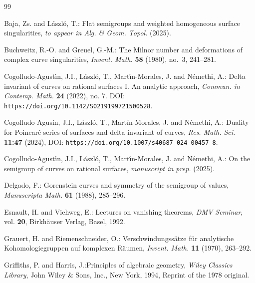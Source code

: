 \documentclass[12pt,a4paper]{amsart}
\theoremstyle{remark}
\theoremstyle{definition}
\begin{document}
%
%
\providecommand{\bysame}{\leavevmode\hbox to3em{\hrulefill}\thinspace}
\providecommand{\MR}{\relax\ifhmode\unskip\space\fi MR }
\providecommand{\MRhref}[2]{%
  \href{http://www.ams.org/mathscinet-getitem?mr=#1}{#2}
}
\begin{thebibliography}{99}

Baja, Zs. and L\'aszl\'o, T.:  Flat semigroups and weighted homogeneous surface singularities, 
{\em to appear in Alg. \& Geom. Topol.}  (2025).

Buchweitz, R.-O. and Greuel, G.-M.: The Milnor number and deformations of
complex curve singularities, \emph{Invent. Math.} \textbf{58} (1980), no.~3, 241--281.


Cogolludo-Agust\'{\i}n, J.I., L\'{a}szl\'{o}, T., Mart\'{\i}n-Morales, J. and
 N\'{e}methi, A.: Delta invariant of curves on rational surfaces {I}.
 {A}n analytic approach, 
 {\em Commun. in Contemp. Math.} {\bf 24} (2022), no. 7.
 DOI: \texttt{https://doi.org/10.1142/S0219199721500528}. 

Cogolludo-Agus\'in, J.I., L\'aszl\'o, T., Mart\'in-Morales, J. and N\'emethi, A.: Duality for Poincar\'e series of surfaces and delta invariant of curves, {\em Res. Math. Sci.} {\bf 11:47} (2024), DOI: \texttt{https://doi.org/10.1007/s40687-024-00457-8}.


Cogolludo-Agust\'{\i}n, J.I., L\'{a}szl\'{o}, T., Mart\'{\i}n-Morales, J. and
 N\'{e}methi, A.: On the semigroup of curves on rational surfaces, {\em manuscript in prep.} (2025). 

 Delgado, F.: Gorenstein curves and symmetry of the semigroup of values, {\em Manuscripta Math.} {\bf 61} (1988), 285--296. 
 
Esnault, H. and Viehweg, E.: Lectures on vanishing theorems, \emph{DMV Seminar}, vol. \textbf{20},
  Birkh\"{a}user Verlag, Basel, 1992.

Grauert, H. and Riemenschneider, O.: Verschwindungss\"{a}tze f\"{u}r
  analytische {K}ohomologiegruppen auf komplexen {R}\"{a}umen, \emph{Invent. Math.}
  \textbf{11} (1970), 263--292.

Griffiths, P. and Harris, J.:Principles of algebraic geometry, \emph{Wiley
  Classics Library}, John Wiley \& Sons, Inc., New York, 1994, Reprint of the
  1978 original.


\end{thebibliography}
\end{document}
